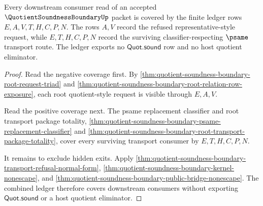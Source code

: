 \begin{theorem}
\label{thm:quotient-soundness-boundary-consumer-ledger-coverage}
Every downstream consumer read of an accepted
$\QuotientSoundnessBoundaryUp$ packet is covered by the finite ledger rows
$E,A,V,T,H,C,P,N$. The rows $A,V$ record the refused representative-style
request, while $E,T,H,C,P,N$ record the surviving classifier-respecting
$\psame$ transport route. The ledger exports no $\mathsf{Quot.sound}$ row and
no host quotient eliminator.
\end{theorem}
\begin{proof}
Read the negative coverage first. By
\autoref{thm:quotient-soundness-boundary-root-request-triad} and
\autoref{thm:quotient-soundness-boundary-root-relation-row-exposure}, each
root quotient-style request is visible through $E,A,V$.

Read the positive coverage next. The psame replacement classifier and root
transport package totality,
\autoref{thm:quotient-soundness-boundary-psame-replacement-classifier} and
\autoref{thm:quotient-soundness-boundary-root-transport-package-totality},
cover every surviving transport consumer by $E,T,H,C,P,N$.

It remains to exclude hidden exits. Apply
\autoref{thm:quotient-soundness-boundary-transport-refusal-normal-form},
\autoref{thm:quotient-soundness-boundary-kernel-nonescape}, and
\autoref{thm:quotient-soundness-boundary-public-bridge-nonescape}. The
combined ledger therefore covers downstream consumers without exporting
$\mathsf{Quot.sound}$ or a host quotient eliminator.
\end{proof}

